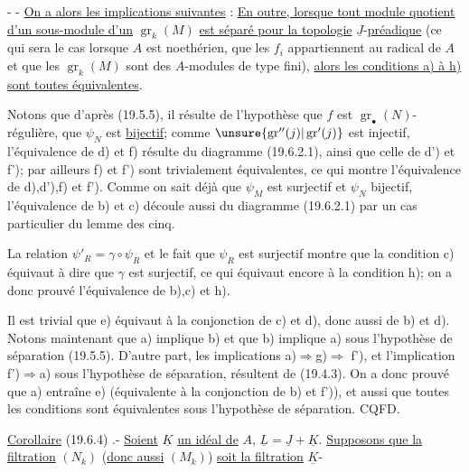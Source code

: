 -  -
\uline{On a alors les implications suivantes} :
\uline{En outre, lorsque tout module quotient d'un sous-module d'un}
$\operatorname{gr}_k(M)$
\uline{est séparé pour la topologie} $\underline J$-\uline{préadique}
(ce qui sera le cas lorsque
$A$ est noethérien, que les $f_i$ appartiennent au radical de $A$ et que
les $\operatorname{gr}_k(M)$ sont des $A$-modules de type fini),
\uline{alors les conditions
a) à h) sont toutes équivalentes}.

Notons que d'après (19.5.5), il résulte de l'hypothèse que $f$ est
$\operatorname{gr}_\bullet(N)$-régulière, que $\psi_N$ est \uline{bijectif};
comme $\unsure{\operatorname{gr}''(j)|\operatorname{gr}'(j)}$ est injectif,
l'équivalence de d) et f) résulte du diagramme (19.6.2.1), ainsi
que celle de d') et f'); par ailleurs f) et f') sont trivialement
équivalentes, ce qui montre l'équivalence de d),d'),f) et f').
Comme on sait déjà que $\psi_M$ est surjectif et $\psi_N$ bijectif, l'équivalence
de b) et c) découle aussi du diagramme (19.6.2.1) par un cas
particulier du lemme des cinq.

La relation $\psi'_R=\gamma\circ\psi_R$
et le fait que $\psi_R$ est surjectif montre que la
condition c) équivaut à dire que $\gamma$ est surjectif, ce qui équivaut
encore à la condition h); on a donc prouvé l'équivalence de b),c)
et h).

Il est trivial que e) équivaut à la  conjonction de c)
et d), donc aussi de b) et d). Notons maintenant que a) implique
b)  et que b) implique a) sous l'hypothèse de séparation
(19.5.5). D'autre part, les implications a)$\Rightarrow$g)$\Rightarrow$ f'),
et
l'implication f')$\Rightarrow$a) sous l'hypothèse de séparation, résultent de
(19.4.3). On a donc prouvé que a) entraîne e) (équivalente à la conjonction
de b) et f')), et aussi que toutes les conditions sont équivalentes
sous l'hypothèse de séparation. CQFD.

\uline{Corollaire} (19.6.4) .- \uline{Soient} $\underline K$ \uline{un idéal de} $A$,
$\underline L=\underline J+\underline K$. \uline{Supposons
que la filtration} $(N_k)$ (\uline{donc aussi} $(M_k)$)
\uline{soit la filtration} $\underline K$-\uline{}
